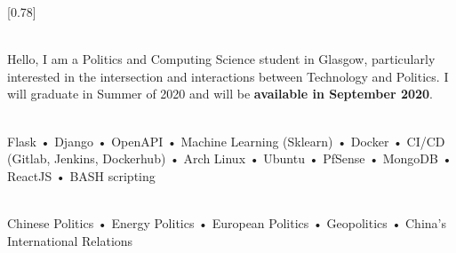 \documentclass[withoutsidebar, hidelinks]{simplehipstercv}
\begin{document}
\setlength{\columnsep}{1cm}
[0.78]
\begin{paracol}{2}

  \paracolbackgroundoptions



  \footnotesize
  {\setasidefontcolour
    \flushright

    \\[0.5em]


    \justifying
    Hello, I am a Politics and Computing Science student in Glasgow, particularly interested in the intersection and interactions between Technology and Politics. I will graduate in Summer of 2020 and will be \textbf{available in September 2020}.

    \flushright

    \bigskip

     \\[0.5em]

    Flask •
    Django •
    OpenAPI •
    Machine Learning (Sklearn) •
    Docker •
    CI/CD (Gitlab, Jenkins, Dockerhub) •
    Arch Linux •
    Ubuntu •
    PfSense •
    MongoDB •
    ReactJS •
    BASH scripting

    \bigskip

     \\[0.5em]

    Chinese Politics •
    Energy Politics •
    European Politics •
    Geopolitics •
    China's International Relations


    \bigskip

     \\[0.5em]

}
\end{paracol}
\end{document}
